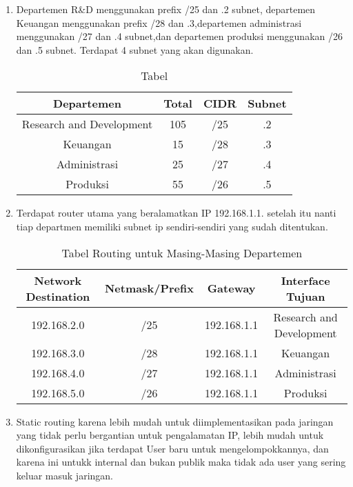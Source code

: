 \begin{enumerate}
    \item Departemen R&D menggunakan prefix /25 dan .2 subnet,
    departemen Keuangan menggunakan prefix /28 dan .3,departemen
    administrasi menggunakan /27 dan .4 subnet,dan departemen produksi menggunakan /26 dan .5 subnet. 
    Terdapat 4 subnet yang akan digunakan.
    \begin{table}[h!]
        \centering
        \begin{tabular}{|c|c|c|c|}
        \hline
        \textbf{Departemen} & \textbf{Total} & \textbf{CIDR} & \textbf{Subnet}\\
        \hline
        Research and Development & 105 & /25  & .2\\
        Keuangan & 15 & /28 & .3 \\
        Administrasi & 25 & /27 & .4\\
        Produksi & 55 & /26 & .5 \\
        \hline
        \end{tabular}
        \caption{Tabel }
        \label{tab:routing}
        \end{table}
    \item Terdapat router utama yang beralamatkan IP 192.168.1.1.  setelah itu nanti tiap
    departmen memiliki subnet ip sendiri-sendiri yang sudah ditentukan.
    \begin{table}[h!]
    \centering
    \begin{tabular}{|c|c|c|c|}
    \hline
    \textbf{Network Destination} & \textbf{Netmask/Prefix} & \textbf{Gateway} & \textbf{Interface Tujuan} \\
    \hline
    192.168.2.0 & /25 & 192.168.1.1 & Research and Development \\
    192.168.3.0 & /28 & 192.168.1.1 & Keuangan \\
    192.168.4.0 & /27 & 192.168.1.1 & Administrasi \\
    192.168.5.0 & /26 & 192.168.1.1 & Produksi \\
    \hline
    \end{tabular}
    \caption{Tabel Routing untuk Masing-Masing Departemen}
    \label{tab:routing}
    \end{table}      
    \item Static routing karena lebih mudah untuk diimplementasikan pada jaringan yang tidak perlu bergantian
    untuk pengalamatan IP, lebih mudah untuk dikonfigurasikan jika terdapat User baru untuk mengelompokkannya,
    dan karena ini untukk internal dan bukan publik maka tidak ada user yang sering keluar masuk jaringan.

\end{enumerate}


